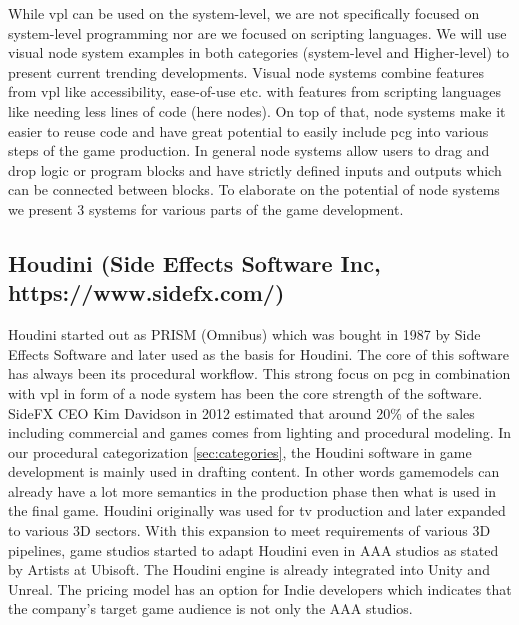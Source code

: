 \documentclass[10pt,a4paper]{article}
\begin{document}
\begin{multicols}{2}
While \gls{vpl} can be used on the system-level, we are not specifically focused on system-level programming nor are we focused on scripting languages. We will use visual node system examples in both categories (system-level and Higher-level) to present current trending developments. Visual node systems combine features from \gls{vpl} like accessibility, ease-of-use etc. with features from scripting languages like needing less lines of code (here nodes). On top of that, node systems make it easier to reuse code and have great potential to easily include \gls{pcg} into various steps of the game production. In general node systems allow users to drag and drop logic or program blocks and have strictly defined inputs and outputs which can be connected between blocks. To elaborate on the potential of node systems we present 3 systems for various parts of the game development. 

\subsection{Houdini (Side Effects Software Inc, https://www.sidefx.com/)}
Houdini started out as PRISM (Omnibus) which was bought in 1987 by Side Effects Software and later used as the basis for Houdini. The core of this software has always been its procedural workflow. This strong focus on \gls{pcg} in combination with \gls{vpl} in form of a node system has been the core strength of the software\cite{Seymour2012}. SideFX CEO Kim Davidson in 2012 estimated that around 20\% of the sales including commercial and games comes from lighting and procedural modeling. In our procedural categorization \autoref{sec:categories}, the Houdini software in game development is mainly used in drafting content. In other words gamemodels can already have a lot more semantics in the production phase then what is used in the final game. Houdini originally was used for tv production and later expanded to various 3D sectors. With this expansion to meet requirements of various 3D pipelines, game studios started to adapt Houdini even in AAA studios as stated by Artists at Ubisoft\cite{Carrier2018}. The Houdini engine is already integrated into Unity and Unreal\cite{SideFXGamesupport}. The pricing model has an option for Indie developers which indicates that the company's target game audience is not only the AAA studios.

\end{multicols}
\end{document}
